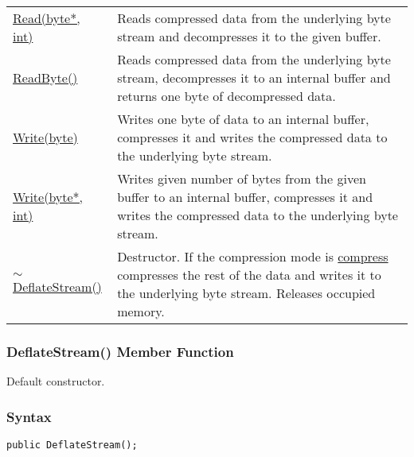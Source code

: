 \documentclass[a4paper,oneside,11.000000pt]{book}
\begin{document}
\begin{flushleft}
\begin{supertabular}[l]{!{\raggedright}p{7.575cm}!{\raggedright}p{7.575cm}}
\\
\hyperlink{System.IO.Compression.DeflateStream.Read.P.System.IO.Compression.DeflateStream.P.byte.int}{Read(byte*, int)}
& Reads compressed data from the underlying byte stream and decompresses it to the given buffer.

\\
\hyperlink{System.IO.Compression.DeflateStream.ReadByte.P.System.IO.Compression.DeflateStream}{ReadByte()}
& Reads compressed data from the underlying byte stream, decompresses it to an internal buffer 
and returns one byte of decompressed data.

\\
\hyperlink{System.IO.Compression.DeflateStream.Write.P.System.IO.Compression.DeflateStream.byte}{Write(byte)}
& Writes one byte of data to an internal buffer, compresses it and writes the compressed data
to the underlying byte stream.

\\
\hyperlink{System.IO.Compression.DeflateStream.Write.P.System.IO.Compression.DeflateStream.P.byte.int}{Write(byte*, int)}
& Writes given number of bytes from the given buffer to an internal buffer, 
compresses it and writes the compressed data to the underlying byte stream.

\\
\hyperlink{System.IO.Compression.DeflateStream.destructor.P.System.IO.Compression.DeflateStream}{$\sim$DeflateStream()}
& Destructor. If the compression mode is \hyperlink{System.IO.Compression.CompressionMode.compress}{compress} compresses the rest of the data
and writes it to the underlying byte stream. Releases occupied memory.

\\
\end{supertabular}

\end{flushleft}
\clearpage

\hypertarget{System.IO.Compression.DeflateStream.constructor.P.System.IO.Compression.DeflateStream}{\subsubsection*{DeflateStream() Member Function}}\begin{flushleft}
Default constructor.

\end{flushleft}
\subsubsection*{Syntax}
\texttt{public DeflateStream();}
\clearpage
\end{document}
